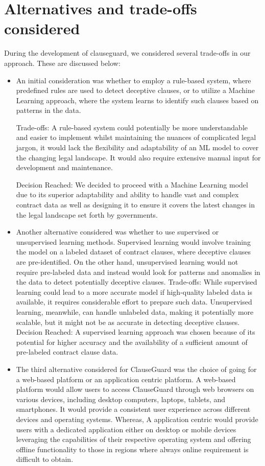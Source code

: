 \section{Alternatives and trade-offs considered \label{Section::Alternatives and trade-offs considered}}
During the development of clauseguard, we considered several trade-offs in our approach. These are discussed below: 
\begin{itemize}
    \item An initial consideration was whether to employ a rule-based system, where predefined rules are used to detect deceptive clauses, or to utilize a Machine Learning approach, where the system learns to identify such clauses based on patterns in the data.

Trade-offs:  A rule-based system could potentially be more understandable and easier to implement whilst maintaining the nuances of complicated legal jargon,  it would lack the flexibility and adaptability of an ML model to cover the changing legal landscape. It would also require extensive manual input for  development and maintenance.

Decision Reached: We decided to proceed with a Machine Learning model due to its superior adaptability and ability to handle vast and complex contract data as well as designing it to ensure it covers the latest changes in the legal landscape set forth by governments. 


\item Another alternative considered was whether to use supervised or unsupervised learning methods. Supervised learning would involve training the model on a labeled dataset of contract clauses, where deceptive clauses are pre-identified. On the other hand, unsupervised learning would not require pre-labeled data and instead would look for patterns and anomalies in the data to detect potentially deceptive clauses.
Trade-offs: While supervised learning could lead to a more accurate model if high-quality labeled data is available, it requires considerable effort to prepare such data. Unsupervised learning, meanwhile, can handle unlabeled data, making it potentially more scalable, but it might not be as accurate in detecting deceptive clauses.
Decision Reached: A supervised learning approach was chosen because of its potential for higher accuracy and the availability of a sufficient amount of pre-labeled contract clause data.


\item The third alternative considered for ClauseGuard was the choice of going for a web-based platform or an application centric platform. A web-based platform would allow users to access ClauseGuard through web browsers on various devices, including desktop computers, laptops, tablets, and smartphones. It would provide a consistent user experience across different devices and operating systems. Whereas, A application centric would provide users with a dedicated application either on desktop or mobile devices leveraging the  capabilities of their respective operating system and offering offline functionality to those in regions where always online requirement is difficult to obtain.


\end{itemize}

